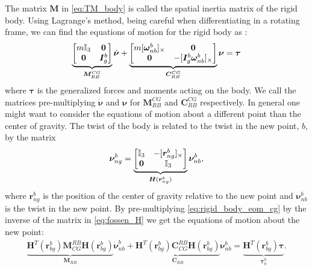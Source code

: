 The matrix $\bm{M}$ in \autoref{eq:TM_body} is called the spatial inertia matrix of the rigid body.
Using Lagrange's method, being careful when differentiating in a rotating frame,
we can find the equations of motion for the rigid body as \cite{fossen2021}:
\begin{align}
    \underbrace{
    \begin{bmatrix}
        m \mathbb{I}_{3} & \bm{0} \\
        \bm{0} & \bm{I}_g^b
    \end{bmatrix}
}_{\bm{M}_{RB}^{CG}} \dot{\bm{\nu}}
    +
    \underbrace{
    \begin{bmatrix}
        m [\bm{\omega}_{nb}^b]_{\times} & \bm{0} \\
        \bm{0} & -[\bm{I}_g^b \bm{\omega}_{nb}^b]_{\times}
    \end{bmatrix}
}_{\bm{C}_{RB}^{CG}}\bm{\nu} = \bm{\tau}
    \label{eq:rigid_body_eom_cg}
\end{align}
where $\bm{\tau}$ is the generalized forces and moments acting on the body. We call the matrices
pre-multiplying $\dot{\bm{\nu}}$ and $\bm{\nu}$ for $\bm{M}_{RB}^{CG}$ and $\bm{C}_{RB}^{CG}$ respectively. In general one might want to consider the equations of motion
about a different point than the center of gravity. The twist of the body is
related to the twist in the new point, $b$, by the matrix \cite{fossen2021}
\begin{align}
        \bm{\nu}_{ng}^{b} =
    \underbrace{
        \begin{bmatrix}
            \mathbb{I}_{3} & -[\bm{r}_{ng}^{b}]_{\times} \\
            \bm{0} & \mathbb{I}_{3}
        \end{bmatrix}
    }_{\bm{H}(\bm{r}_{ng}^b)}
    \bm{\nu}_{nb}^{b},
    \label{eq:fossen_H}
\end{align}
where $\bm{r}_{ng}^{b}$ is the position of the center of gravity relative to the
new point and $\bm{\nu}_{nb}^{b}$ is the twist in the new point. By
pre-multiplying \autoref{eq:rigid_body_eom_cg} by the inverse of the matrix
in \autoref{eq:fossen_H} we get the equations of motion about the new point:
\begin{align}
    \underbrace{
        \bm{H}^T(\bm{r}_{bg}^b) \bm{M}_{CG}^{RB} \bm{H}(\bm{r}_{bg}^b)
    }_{\bm{M}_{RB}}
    \dot{\bm{\nu}}_{nb}^b
    + \underbrace{
        \bm{H}^T(\bm{r}_{bg}^b) \bm{C}_{CG}^{RB} \bm{H}(\bm{r}_{bg}^b)
    }_{\bm{C}_{RB}}
    \bm{\nu}_{nb}^b
    = \underbrace{
        \bm{H}^T(\bm{r}_{bg}^b)
    \bm{\tau}
    }_{\bm{\tau}_{b}^b}.
\end{align}
